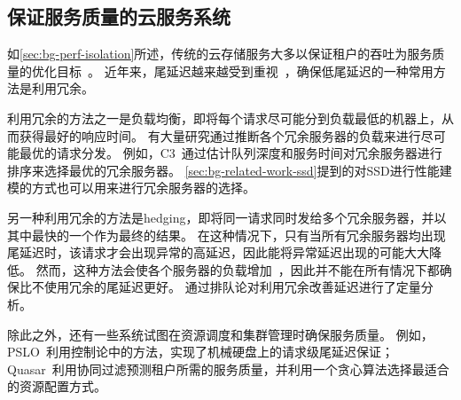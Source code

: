 \subsection{保证服务质量的云服务系统}
\label{sec:bg-related-work-system}

如\autoref{sec:bg-perf-isolation}所述，传统的云存储服务大多以保证租户的吞吐为服务质量的优化目标~\cite{patterson2004latency, cgroup,gulati2010mclock}。
近年来，尾延迟越来越受到重视~\cite{dean2013tail}，确保低尾延迟的一种常用方法是利用冗余。

利用冗余的方法之一是负载均衡，即将每个请求尽可能分到负载最低的机器上，从而获得最好的响应时间。
有大量研究通过推断各个冗余服务器的负载来进行尽可能最优的请求分发。
例如，C3~\cite{suresh2015c3}通过估计队列深度和服务时间对冗余服务器进行排序来选择最优的冗余服务器。
\autoref{sec:bg-related-work-ssd}提到的对SSD进行性能建模的方式也可以用来进行冗余服务器的选择。

另一种利用冗余的方法是hedging，即将同一请求同时发给多个冗余服务器，并以其中最快的一个作为最终的结果。
在这种情况下，只有当所有冗余服务器均出现尾延迟时，该请求才会出现异常的高延迟，因此能将异常延迟出现的可能大大降低。
然而，这种方法会使各个服务器的负载增加~\cite{primorac2021hedge}，因此并不能在所有情况下都确保比不使用冗余的尾延迟更好。
\citet{vulimiri2013low}通过排队论对利用冗余改善延迟进行了定量分析。

除此之外，还有一些系统试图在资源调度和集群管理时确保服务质量。
例如，PSLO~\cite{li2016pslo}利用控制论中的方法，实现了机械硬盘上的请求级尾延迟保证；
Quasar~\cite{delimitrou2014quasar}利用协同过滤预测租户所需的服务质量，并利用一个贪心算法选择最适合的资源配置方式。